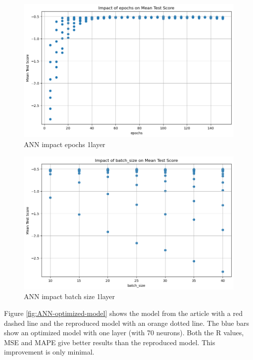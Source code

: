 \documentclass{article}
\begin{document}
\begin{figure}
	\centering
	\includegraphics[width=\linewidth]{figures/ANN_impact_epochs_1layer.png}
	\caption{ANN impact epochs 1layer}
	\label{fig:ANN-impact-epochs-1layer}
\end{figure}

\begin{figure}
	\centering
	\includegraphics[width=\linewidth]{figures/ANN_impact_batchsize_1layer.png}
	\caption{ANN impact batch size 1layer}
	\label{fig:ANN-impact-batchsize-1layer}
\end{figure}

Figure \ref{fig:ANN-optimized-model} shows the model from the article with a red dashed line and the reproduced model with an orange dotted line. The blue bars show an optimized model with one layer (with 70 neurons). Both the R values, MSE and MAPE give better results than the reproduced model. This improvement is only minimal.
\end{document}
